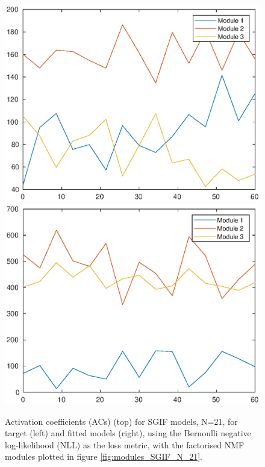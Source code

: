 \documentclass[mphil,deptreport,ianc]{infthesis} %
\begin{document}
\begin{figure}
    \includegraphics[width=0.49\columnwidth]{figures/matlab/NMF/ACs_target_GT_model_microGIF_N_21.eps}
    \includegraphics[width=0.49\columnwidth]{figures/matlab/NMF/ACs_nuovo_synthetic_v2_spikes_mt_microGIF_lfn_bernoulli_nll_euid_01-01_15-56-11-305.eps}
    \caption{Activation coefficients (ACs) (top) for SGIF models, N=21, for target (left) and fitted models (right), using the Bernoulli negative log-likelihood (NLL) as the loss metric, with the factorised NMF modules plotted in figure \ref{fig:modules_SGIF_N_21}.}
    \label{fig:ACs_SGIF_N_21}
\end{figure}
\end{document}
